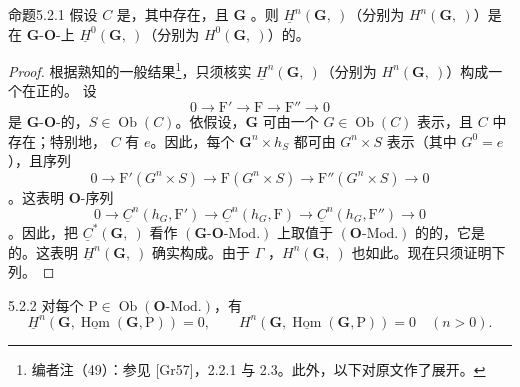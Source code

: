 \begin{SGAresult}{命题}{5.2.1}
假设 $C$ 是，其中存在，且 $\mathbf G$ 。则 $\underline H^n(\mathbf G,\ )$（分别为 $H^n(\mathbf G,\ )$）是在 $\mathbf G$-$\mathbf O$-上 $\underline H^0(\mathbf G,\ )$（分别为 $H^0(\mathbf G,\ )$）的。
\end{SGAresult}
\begin{proof}
根据熟知的一般结果\footnote{编者注（49）：参见 [Gr57]，2.2.1 与 2.3。此外，以下对原文作了展开。}，只须核实 $\underline H^n(\mathbf G,\ )$（分别为 $H^n(\mathbf G,\ )$）构成一个在正的。
设
\[
0\longrightarrow\mathrm F'\longrightarrow\mathrm F\longrightarrow\mathrm F''\longrightarrow0
\]
是 $\mathbf G$-$\mathbf O$-的，$S\in\operatorname{Ob}(C)$。依假设，$\mathbf G$ 可由一个 $G\in\operatorname{Ob}(C)$ 表示，且 $C$ 中存在；特别地，
$C$ 有 $e$。因此，每个 $\mathbf G^n\times h_S$ 都可由 $G^n\times S$ 表示（其中 $G^0=e$），且序列
\[
0\longrightarrow\mathrm F'(G^n\times S)\longrightarrow\mathrm F(G^n\times S)\longrightarrow\mathrm F''(G^n\times S)\longrightarrow0
\]
。这表明 $\mathbf O$-序列
\[
0\longrightarrow\underline C^n(h_G,\mathrm F')\longrightarrow\underline C^n(h_G,\mathrm F)\longrightarrow\underline C^n(h_G,\mathrm F'')\longrightarrow0
\]
。因此，把 $\underline C^*(\mathbf G,\ )$ 看作 $(\mathbf G\text{-}\mathbf O\text{-}\mathrm{Mod.})$ 上取值于 $(\mathbf O\text{-}\mathrm{Mod.})$ 的的，它是的。这表明 $\underline H^n(\mathbf G,\ )$ 确实构成。由于 $\Gamma$ ，$H^n(\mathbf G,\ )$ 也如此。现在只须证明下列。
\end{proof}
\begin{SGAresult}{}{5.2.2}
对每个 $\mathrm P\in\operatorname{Ob}(\mathbf O\text{-}\mathrm{Mod.})$，有
\[
\underline H^n(\mathbf G,\underline{\operatorname{Hom}}(\mathbf G,\mathrm P))=0,\qquad
H^n(\mathbf G,\underline{\operatorname{Hom}}(\mathbf G,\mathrm P))=0\quad(n>0).
\]
\end{SGAresult}
